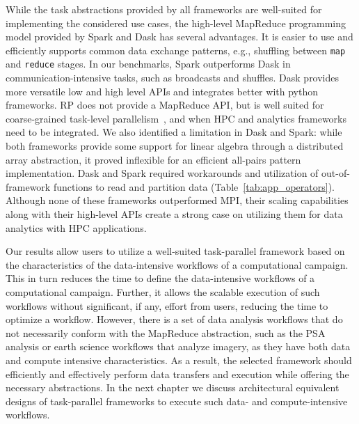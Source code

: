 While the task abstractions provided by all frameworks are well-suited for
implementing the considered use cases, the high-level MapReduce programming
model provided by Spark and Dask has several advantages. It is easier to use and
efficiently supports common data exchange patterns, e.g., shuffling between
\texttt{map} and \texttt{reduce} stages. In our benchmarks, Spark outperforms
Dask in communication-intensive tasks, such as broadcasts and shuffles. Dask
provides more versatile low and high level APIs and integrates better with
python frameworks. RP does not provide a MapReduce API, but is well
suited for coarse-grained task-level parallelism~\cite{merzky2018design,
merzky2019using}, and when HPC and analytics frameworks need to be integrated.
We also identified a limitation in Dask and Spark: while both frameworks provide
some support for linear algebra through a distributed array abstraction, it
proved inflexible for an efficient all-pairs pattern implementation. Dask and
Spark required workarounds and utilization of out-of-framework functions to read
and partition data (Table~\ref{tab:app_operators}). Although none of these
frameworks outperformed MPI, their scaling capabilities along with their
high-level APIs create a strong case on utilizing them for data analytics with
HPC applications.

Our results allow users to utilize a well-suited task-parallel framework based
on the characteristics of the data-intensive workflows of a computational
campaign. This in turn reduces the time to define the data-intensive workflows
of a computational campaign. Further, it allows the scalable execution of such
workflows without significant, if any, effort from users, reducing the time to
optimize a workflow. However, there is a set of data analysis workflows that do
not necessarily conform with the MapReduce abstraction, such as the PSA analysis
or earth science workflows that analyze imagery, as they have both data and
compute intensive characteristics. As a result, the selected framework should
efficiently and effectively perform data transfers and execution while offering
the necessary abstractions. In the next chapter we discuss architectural
equivalent designs of task-parallel frameworks to execute such data- and
compute-intensive workflows.
